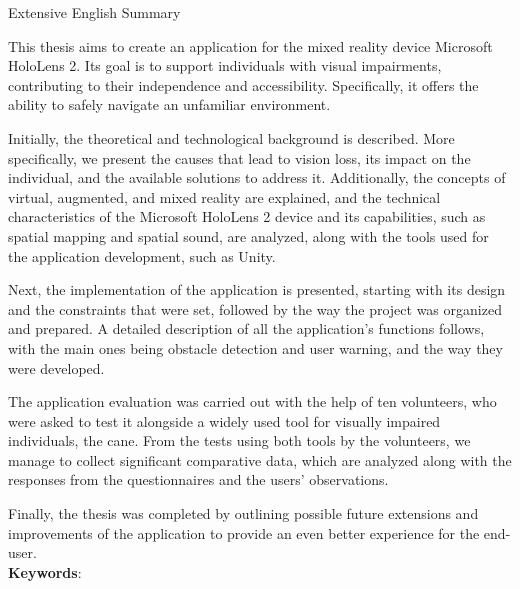 \pagestyle{plain}
\begin{center}
{\LARGE Extensive English Summary}\\[1cm]
\end{center}

\setlength{\parindent}{0pt}
This thesis aims to create an application for the mixed reality device Microsoft HoloLens 2. Its goal is to support individuals with visual impairments, contributing to their independence and accessibility. Specifically, it offers the ability to safely navigate an unfamiliar environment.

Initially, the theoretical and technological background is described. More specifically, we present the causes that lead to vision loss, its impact on the individual, and the available solutions to address it. Additionally, the concepts of virtual, augmented, and mixed reality are explained, and the technical characteristics of the Microsoft HoloLens 2 device and its capabilities, such as spatial mapping and spatial sound, are analyzed, along with the tools used for the application development, such as Unity.

Next, the implementation of the application is presented, starting with its design and the constraints that were set, followed by the way the project was organized and prepared. A detailed description of all the application's functions follows, with the main ones being obstacle detection and user warning, and the way they were developed.

The application evaluation was carried out with the help of ten volunteers, who were asked to test it alongside a widely used tool for visually impaired individuals, the cane. From the tests using both tools by the volunteers, we manage to collect significant comparative data, which are analyzed along with the responses from the questionnaires and the users' observations.

Finally, the thesis was completed by outlining possible future extensions and improvements of the application to provide an even better experience for the end-user.
\\[\baselineskip]
\textbf{Keywords}: {\keywordsEnglish}